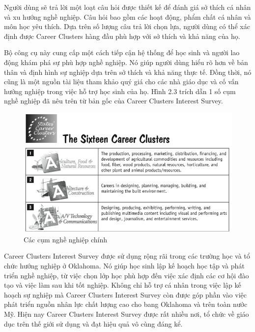 Người dùng sẽ trả lời một loạt câu hỏi được thiết kế để đánh giá sở thích cá nhân và xu hướng nghề nghiệp. Câu hỏi bao gồm các hoạt động, phẩm chất cá nhân và môn học yêu thích. Dựa trên số lượng câu trả lời chọn lựa, người dùng có thể xác định được Career Clusters hàng đầu phù hợp với sở thích và khả năng của họ. 

Bộ công cụ này cung cấp một cách tiếp cận hệ thống để học sinh và người lao động khám phá sự phù hợp nghề nghiệp. Nó giúp người dùng hiểu rõ hơn về bản thân và định hình sự nghiệp dựa trên sở thích và khả năng thực tế. Đồng thời, nó cũng là một nguồn tài liệu tham khảo quý giá cho các nhà giáo dục và cố vấn hướng nghiệp trong việc hỗ trợ học sinh của họ.
Hình 2.3 trích dẫn 1 số cụm nghề nghiệp đã nêu trên từ bản gốc của Career Clusters Interest Survey.
\begin{figure}[H]
    \centering
    \includegraphics[width=0.5\linewidth]{images/CC.png}
    \vspace{0.6cm}
    \caption{Các cụm nghề nghiệp chính}
\end{figure}
Career Clusters Interest Survey được sử dụng rộng rãi trong các trường học và tổ chức hướng nghiệp ở Oklahoma. Nó giúp học sinh lập kế hoạch học tập và phát triển nghề nghiệp, từ việc chọn lớp học phù hợp đến việc xác định các cơ hội đào tạo và việc làm sau khi tốt nghiệp. Không chỉ hỗ trợ cá nhân trong việc lập kế hoạch sự nghiệp mà Career Clusters Interest Survey còn được  góp phần vào việc phát triển nguồn nhân lực chất lượng cao cho bang Oklahoma và trên toàn nước Mỹ. Hiện nay Career Clusters Interest Survey được rất nhiều nơi, tổ chức về giáo dục trên thế giới sử dụng và đạt hiệu quả vô cùng đáng kể. 

